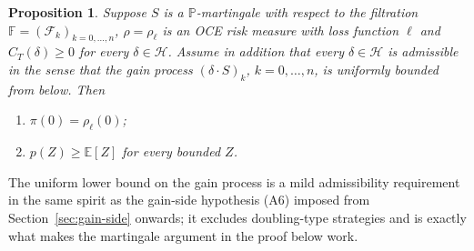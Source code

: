 \documentclass[11pt,a4paper]{report}
\numberwithin{equation}{chapter}
\theoremstyle{plain}
\newtheorem{proposition}{Proposition}[chapter]
\theoremstyle{definition}
\newcommand{\E}{\mathbb{E}}
\newcommand{\PP}{\mathbb{P}}
\newcommand{\F}{\mathcal{F}}
\newcommand{\HH}{\mathcal{H}}
\begin{document}
\begin{proposition}\label{prop:martingale}
    Suppose $S$ is a $\PP$-martingale with respect to the filtration $\mathbb{F}=(\F_k)_{k=0,\dots,n}$, $\rho=\rho_\ell$ is an OCE risk measure with loss function $\ell$ and $C_T(\delta)\ge0$ for every $\delta\in\HH$. Assume in addition that every $\delta\in\HH$ is admissible in the sense that the gain process $(\delta\cdot S)_k$, $k=0,\dots,n$, is uniformly bounded from below. Then
    \begin{enumerate}[leftmargin=*]
        \item[\textup{(i)}] $\pi(0)=\rho_\ell(0)$;
        \item[\textup{(ii)}] $p(Z)\ge\E[Z]$ for every bounded $Z$.
    \end{enumerate}
\end{proposition}

The uniform lower bound on the gain process is a mild admissibility requirement in the same spirit as the gain-side hypothesis (A6) imposed from Section~\ref{sec:gain-side} onwards; it excludes doubling-type strategies and is exactly what makes the martingale argument in the proof below work.
\end{document}
